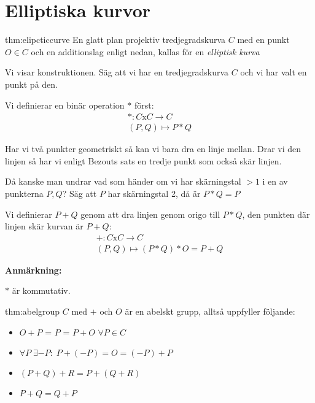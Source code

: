 \section{Elliptiska kurvor}\par
\begin{theo}{thm:elipcticcurve}
  En glatt plan projektiv tredjegradskurva $C$ med en punkt $O\in C$ och en additionslag enligt nedan, kallas för en \textit{elliptisk kurva} 
\end{theo}
\par\bigskip
\noindent Vi visar konstruktionen. Säg att vi har en tredjegradskurva $C$ och vi har valt en punkt på den. \par
\noindent Vi definierar en binär operation $*$ först:
\begin{equation*}
  \begin{gathered}
    *:C\text{x}C\to C\\
    (P,Q)\mapsto P*Q
  \end{gathered}
\end{equation*}
\par\bigskip
\noindent Har vi två punkter geometriskt så kan vi bara dra en linje mellan. Drar vi den linjen så har vi enligt Bezouts sats en tredje punkt som också skär linjen.\par
\noindent Då kanske man undrar vad som händer om vi har skärningstal $>1$ i en av punkterna $P,Q$? Säg att $P$ har skärningstal 2, då är $P*Q = P$
\par\bigskip
\noindent Vi definierar $P+Q$ genom att dra linjen genom origo till $P*Q$, den punkten där linjen skär kurvan är $P+Q$:
\begin{equation*}
  \begin{gathered}
    +:C\text{x}C\to C\\
    (P,Q)\mapsto(P*Q)*O = P+Q
  \end{gathered}
\end{equation*}
\par\bigskip
\noindent\textbf{Anmärkning:}\par
\noindent $*$ är kommutativ.
\par\bigskip
\begin{theo}{thm:abelgroup}
  $C$ med $+$ och $O$ är en abelskt grupp, alltså uppfyller följande:\par
  \begin{itemize}
  \item $O+P$ = $P$ = $P+O$ $\forall P\in C$
  \item $\forall P\;\exists -P:\; P+(-P) = O = (-P)+P$
  \item $(P+Q)+R = P+(Q+R)$
  \item $P+Q = Q+P$
  \end{itemize}
\end{theo}
